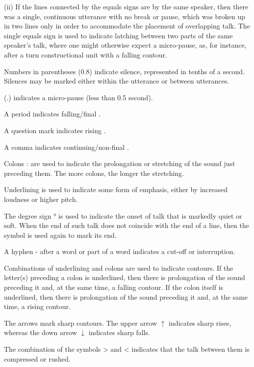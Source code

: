 \documentclass[output=paper]{LSP/langsci}
\begin{document}
\begin{description}
(ii) If the lines connected by the equals signs are by the same speaker, then there was a single, continuous utterance with no break or pause, which was broken up in two lines only in order to accommodate the placement of overlapping talk. 
The single equals sign is used to indicate latching between two parts of the same speaker’s talk, where one might otherwise expect a micro-pause, as, for instance, after a turn constructional unit with a falling  contour. 
\item  Numbers in parentheses (0.8) indicate silence, represented in tenths of a second. Silences may be marked either within the utterance or between utterances. 
\item  (.) indicates a micro-pause (less than 0.5 second).
\item A period indicates falling/final .
\item A question mark indicates rising .
\item A comma indicates continuing/non-final . 
\item Colons : are used to indicate the prolongation or stretching of the sound just preceding them. The more colons, the longer the stretching.
\item Underlining is used to indicate some form of emphasis, either by increased loudness or higher pitch. 
\item The degree sign ° is used to indicate the onset of talk that is markedly quiet or soft. When the end of such talk does not coincide with the end of a line, then the symbol is used again to mark its end. 
\item A hyphen - after a word or part of a word indicates a cut-off or interruption.
\item Combinations of underlining and colons are used to indicate  contours. If the letter(s) preceding a colon is underlined, then there is prolongation of the sound preceding it and, at the same time, a falling  contour. If the colon itself is underlined, then there is prolongation of the sound preceding it and, at the same time, a rising  contour. 
\item The arrows mark sharp  contours. The upper arrow $\uparrow$ indicates sharp  rises, whereas the down arrow $\downarrow$  indicates sharp  falls. 
\item The combination of the symbols  > and < indicates that the talk between them is compressed or rushed. 

\end{description}
\end{document}
